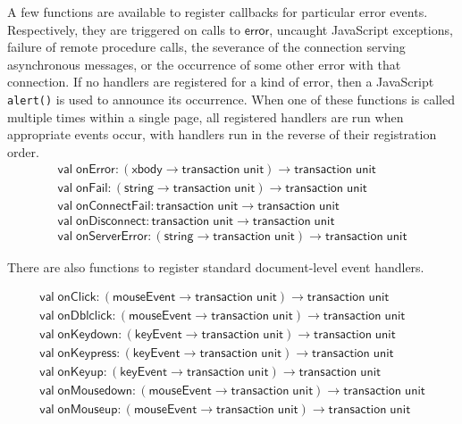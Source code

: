 \documentclass{article}
\newcommand{\cd}[1]{\texttt{#1}}
\newcommand{\mt}[1]{\mathsf{#1}}
\begin{document}
A few functions are available to register callbacks for particular error events.  Respectively, they are triggered on calls to $\mt{error}$, uncaught JavaScript exceptions, failure of remote procedure calls, the severance of the connection serving asynchronous messages, or the occurrence of some other error with that connection.  If no handlers are registered for a kind of error, then a JavaScript \cd{alert()} is used to announce its occurrence.  When one of these functions is called multiple times within a single page, all registered handlers are run when appropriate events occur, with handlers run in the reverse of their registration order.
$$\begin{array}{l}
  \mt{val} \; \mt{onError} : (\mt{xbody} \to \mt{transaction} \; \mt{unit}) \to \mt{transaction} \; \mt{unit} \\
  \mt{val} \; \mt{onFail} : (\mt{string} \to \mt{transaction} \; \mt{unit}) \to \mt{transaction} \; \mt{unit} \\
  \mt{val} \; \mt{onConnectFail} : \mt{transaction} \; \mt{unit} \to \mt{transaction} \; \mt{unit} \\
  \mt{val} \; \mt{onDisconnect} : \mt{transaction} \; \mt{unit} \to \mt{transaction} \; \mt{unit} \\
  \mt{val} \; \mt{onServerError} : (\mt{string} \to \mt{transaction} \; \mt{unit}) \to \mt{transaction} \; \mt{unit}
\end{array}$$

There are also functions to register standard document-level event handlers.

$$\begin{array}{l}
 \mt{val} \; \mt{onClick} : (\mt{mouseEvent} \to \mt{transaction} \; \mt{unit}) \to \mt{transaction} \; \mt{unit} \\
 \mt{val} \; \mt{onDblclick} : (\mt{mouseEvent} \to \mt{transaction} \; \mt{unit}) \to \mt{transaction} \; \mt{unit} \\
 \mt{val} \; \mt{onKeydown} : (\mt{keyEvent} \to \mt{transaction} \; \mt{unit}) \to \mt{transaction} \; \mt{unit} \\
 \mt{val} \; \mt{onKeypress} : (\mt{keyEvent} \to \mt{transaction} \; \mt{unit}) \to \mt{transaction} \; \mt{unit} \\
 \mt{val} \; \mt{onKeyup} : (\mt{keyEvent} \to \mt{transaction} \; \mt{unit}) \to \mt{transaction} \; \mt{unit} \\
 \mt{val} \; \mt{onMousedown} : (\mt{mouseEvent} \to \mt{transaction} \; \mt{unit}) \to \mt{transaction} \; \mt{unit} \\
 \mt{val} \; \mt{onMouseup} : (\mt{mouseEvent} \to \mt{transaction} \; \mt{unit}) \to \mt{transaction} \; \mt{unit}
\end{array}$$
\end{document}
